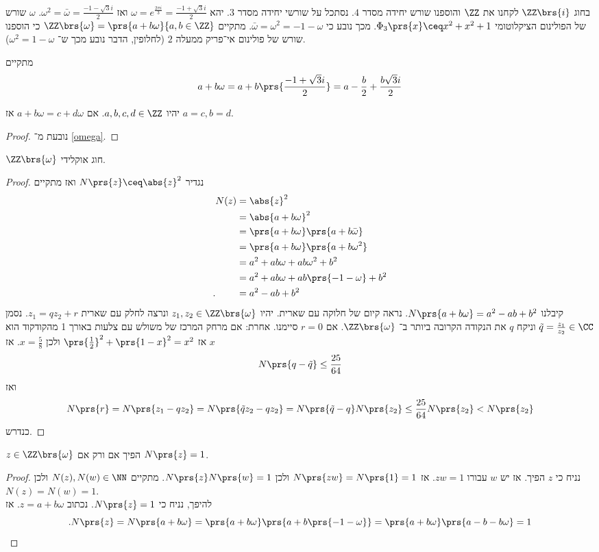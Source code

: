 \documentclass[a4paper,10pt,twoside,openany]{book}
\begin{document}
בחוג
$\ZZ\brs{i}$
לקחנו את
$\ZZ$
והוספנו שורש יחידה מסדר
$4$.
נסתכל על שורשי יחידה מסדר
$3$.
יהא
$\omega = e^{\frac{2\pi i}{3}} = \frac{-1 + \sqrt{3}i}{2}$
ואז
$\omega^2 = \bar{\omega} = \frac{-1 - \sqrt{3}i}{2}$.
$\omega$
שורש של הפולינום הציקלוטומי
$\Phi_3\prs{x} \ceq x^2 + x^2 + 1$.
מכך נובע כי
$\bar{\omega} = \omega^2 = -1 - \omega$.
מתקיים
$\ZZ\brs{\omega} = \prs{a + b\omega}{a,b\in \ZZ}$
כי הוספנו שורש של פולינום אי־פריק ממעלה
$2$
(לחלופין, הדבר נובע מכך ש־%
$\omega^2 = 1-\omega$).

מתקיים
\begin{align} \label{omega}
a+b\omega = a+b\prs{\frac{-1 + \sqrt{3}i}{2}} = a -\frac{b}{2} + \frac{b\sqrt{3}i}{2}
\end{align}

\begin{proposition}
יהיו
$a,b,c,d\in \ZZ$.
אם
$a+b\omega = c + d\omega$
אז
$a=c, b=d$.
\end{proposition}
\begin{proof}
נובעת מ־%
\ref{omega}.
\end{proof}
\begin{theorem}
$\ZZ\brs{\omega}$
חוג אוקלידי.
\end{theorem}
\begin{proof}
נגדיר
$N\prs{z} \ceq \abs{z}^2$
ואז מתקיים
\begin{align*}
N(z) &= \abs{z}^2 \\
&= \abs{a+b\omega}^2 \\
&= \prs{a+b\omega} \prs{a +b\bar{\omega}} \\
&= \prs{a+b\omega}\prs{a+b\omega^2} \\
&= a^2 + ab\omega + ab\omega^2 + b^2 \\
&= a^2 + ab\omega + ab\prs{-1-\omega} + b^2 \\
\text{.} \phantom{N(z)} &= a^2 -ab + b^2
\end{align*}
קיבלנו
$N\prs{a+b\omega} = a^2 -ab + b^2$.
נראה קיום של חלוקה עם שארית.
יהיו
$z_1, z_2 \in \ZZ\brs{\omega}$
ונרצה לחלק עם שארית
$z_1 = qz_2 + r$.
נסמן
$\tilde{q} = \frac{z_1}{z_2} \in \CC$
וניקח
$q$
את הנקודה הקרובה ביותר ב־%
$\ZZ\brs{\omega}$.
אם
$r = 0$
סיימנו. אחרת:
אם מרחק המרכז של משולש עם צלעות באורך 1 מהקודקוד הוא
$x$
אז
$\prs{\frac{1}{2}}^2 + \prs{1-x}^2 = x^2$
ולכן
$x = \frac{5}{8}$.
אז
\[N\prs{q-\tilde{q}} \leq \frac{25}{64}\]
ואז
\[N\prs{r} = N\prs{z_1 - qz_2} = N\prs{\tilde{q}z_2 - qz_2} = N\prs{\tilde{q} - q} N\prs{z_2} \leq \frac{25}{64}N\prs{z_2} < N\prs{z_2}\]
כנדרש.
\end{proof}
\begin{proposition}
$z \in \ZZ\brs{\omega}$
הפיך אם ורק אם
$N\prs{z} = 1$.
\end{proposition}
\begin{proof}
נניח כי
$z$
הפיך. אז יש
$w$
עבורו
$zw = 1$.
אז
$N\prs{zw} = N\prs{1} = 1$
ולכן
$N\prs{z} N\prs{w} = 1$.
מתקיים
$N(z),N(w) \in \NN$
ולכן
$N(z) = N(w) = 1$.\\
להיפך, נניח כי
$N\prs{z} = 1$.
נכתוב
$z = a + b\omega$.
אז
\[\text{.} N\prs{z} = N\prs{a+b\omega} = \prs{a+b\omega}\prs{a+b\prs{-1-\omega}} = \prs{a+b\omega}\prs{a-b-b\omega} = 1\]
\end{proof}
\end{document}
